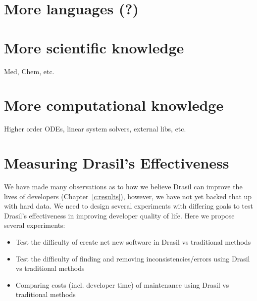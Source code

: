 \section{More languages (?)}

\section{More scientific knowledge}

Med, Chem, etc.

\section{More computational knowledge}

Higher order ODEs, linear system solvers, external libs, etc.


\section{Measuring Drasil's Effectiveness}

We have made many observations as to how we believe Drasil can improve the 
lives of developers (Chapter~\ref{c:results}), however, we have not yet backed 
that up with hard data. We need to design several experiments with differing 
goals to test Drasil's effectiveness in improving developer quality of life. 
Here we propose several experiments:

\begin{itemize}
\item Test the difficulty of create net new software in Drasil vs traditional 
methods
\item Test the difficulty of finding and removing inconsistencies/errors using 
Drasil vs traditional methods
\item Comparing costs (incl. developer time) of maintenance using Drasil vs 
traditional methods
\end{itemize}


